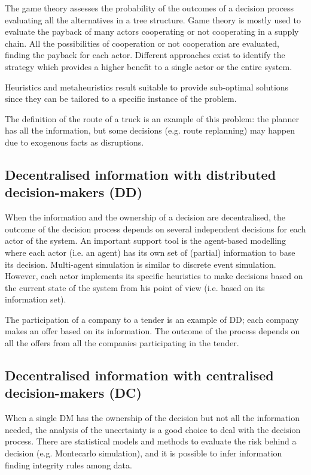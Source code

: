 The game theory assesses the probability of the outcomes of a decision process evaluating all the alternatives in a tree structure. Game theory is mostly used to evaluate the payback of many actors cooperating or not cooperating in a supply chain. All the possibilities of cooperation or not cooperation are evaluated, finding the payback for each actor. Different approaches exist to identify the strategy which provides a higher benefit to a single actor or the entire system.\par

Heuristics and metaheuristics result suitable to provide sub-optimal solutions since they can be tailored to a specific instance of the problem.\par

The definition of the route of a truck is an example of this problem: the planner has all the information, but some decisions (e.g. route replanning) may happen due to exogenous facts as disruptions. 

\subsection{Decentralised information with distributed decision-makers (DD)}

When the information and the ownership of a decision are decentralised, the outcome of the decision process depends on several independent decisions for each actor of the system. An important support tool is the agent-based modelling where each actor (i.e. an agent) has its own set of (partial) information to base its decision. Multi-agent simulation is similar to discrete event simulation. However, each actor implements its specific heuristics to make decisions based on the current state of the system from his point of view (i.e. based on its information set). \par

The participation of a company to a tender is an example of DD; each company makes an offer based on its information. The outcome of the process depends on all the offers from all the companies participating in the tender.

\subsection{Decentralised information with centralised decision-makers (DC)}
When a single DM has the ownership of the decision but not all the information needed, the analysis of the uncertainty is a good choice to deal with the decision process. There are statistical models and methods to evaluate the risk behind a decision (e.g. Montecarlo simulation), and it is possible to infer information finding integrity rules among data. \par

